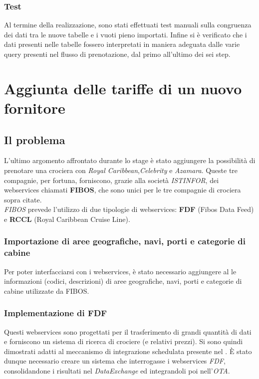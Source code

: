 \subsubsection{Test}
Al termine della realizzazione, sono stati effettuati test manuali sulla congruenza dei dati tra le nuove tabelle e i vuoti pieno importati. 
Infine si è verificato che i dati presenti nelle tabelle fossero interpretati in maniera adeguata dalle varie query presenti nel flusso di prenotazione, dal primo all'ultimo dei sei step.
\newpage
\section{Aggiunta delle tariffe di un nuovo fornitore}
\subsection{Il problema}
L'ultimo argomento affrontato durante lo stage è stato aggiungere la possibilità di prenotare una crociera con \textit{Royal Caribbean},\textit{Celebrity} e \textit{Azamara}. Queste tre compagnie, per fortuna, forniscono, grazie alla società \textit{ISTINFOR}, dei \glspl{webservice} chiamati \textbf{FIBOS}, che sono unici per le tre compagnie di crociera sopra citate. \\
\textit{FIBOS} prevede l'utilizzo di due tipologie di \glspl{webservice}: \textbf{FDF} (Fibos Data Feed) e \textbf{RCCL} (Royal Caribbean Cruise Line).
\subsubsection{Importazione di aree geografiche, navi, porti e categorie di cabine}
Per poter interfacciarsi con i \glspl{webservice}, è stato necessario aggiungere al \bookingEngine le informazioni (codici, descrizioni) di aree geografiche, navi, porti e categorie di cabine utilizzate da FIBOS.

\subsubsection{Implementazione di FDF}
Questi \glspl{webservice} sono progettati per il trasferimento di grandi quantità di dati e forniscono un sistema di ricerca di crociere (e relativi prezzi). Si sono quindi dimostrati adatti al meccanismo di integrazione schedulata presente nel \bookingEngine. È stato dunque necessario creare un sistema che interrogasse i \glspl{webservice} \textit{FDF}, consolidandone i risultati nel \textit{DataExchange} ed integrandoli poi nell'\textit{OTA}. 

